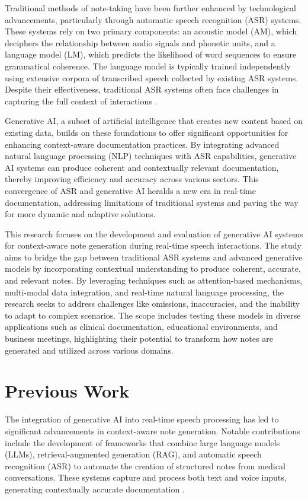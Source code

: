 \documentclass[12pt,a4paper]{article}
\begin{document}
Traditional methods of note-taking have been further enhanced by technological
advancements, particularly through automatic speech recognition (ASR) systems.
These systems rely on two primary components: an acoustic model (AM), which
deciphers the relationship between audio signals and phonetic units, and a
language model (LM), which predicts the likelihood of word sequences to ensure
grammatical coherence. The language model is typically trained independently
using extensive corpora of transcribed speech collected by existing ASR systems.
Despite their effectiveness, traditional ASR systems often face challenges in
capturing the full context of interactions \cite{itsp2022}.

Generative AI, a subset of artificial intelligence that creates new content
based on existing data, builds on these foundations to offer significant
opportunities for enhancing context-aware documentation practices. By
integrating advanced natural language processing (NLP) techniques with ASR
capabilities, generative AI systems can produce coherent and contextually
relevant documentation, thereby improving efficiency and accuracy across various
sectors. This convergence of ASR and generative AI heralds a new era in
real-time documentation, addressing limitations of traditional systems and
paving the way for more dynamic and adaptive solutions.

This research focuses on the development and evaluation of generative AI systems
for context-aware note generation during real-time speech interactions. The
study aims to bridge the gap between traditional ASR systems and advanced
generative models by incorporating contextual understanding to produce coherent,
accurate, and relevant notes. By leveraging techniques such as attention-based
mechanisms, multi-modal data integration, and real-time natural language
processing, the research seeks to address challenges like omissions,
inaccuracies, and the inability to adapt to complex scenarios. The scope
includes testing these models in diverse applications such as clinical
documentation, educational environments, and business meetings, highlighting
their potential to transform how notes are generated and utilized across various
domains.

\newpage
\section{Previous Work}
The integration of generative AI into real-time speech processing has led to
significant advancements in context-aware note generation. Notable contributions
include the development of frameworks that combine large language models (LLMs),
retrieval-augmented generation (RAG), and automatic speech recognition (ASR) to
automate the creation of structured notes from medical conversations. These
systems capture and process both text and voice inputs, generating contextually
accurate documentation \cite{leong2024gen}.
\end{document}
